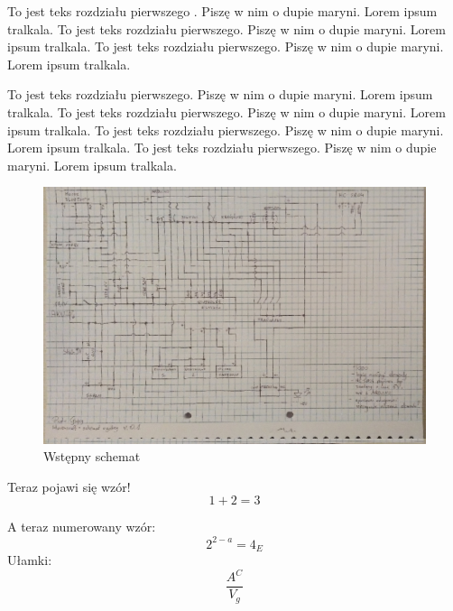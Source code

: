 \documentclass[test.tex]{subfiles}
\begin{document}
To jest teks rozdziału pierwszego \cite{Nowak} . Piszę w nim o dupie maryni.
Lorem ipsum tralkala. To jest teks rozdziału pierwszego. Piszę w nim o dupie maryni.
Lorem ipsum tralkala. To jest teks rozdziału pierwszego. Piszę w nim o dupie maryni.
Lorem ipsum tralkala. 



To jest teks rozdziału pierwszego. Piszę w nim o dupie maryni.
Lorem ipsum tralkala. To jest teks rozdziału pierwszego. Piszę w nim o dupie maryni.
Lorem ipsum tralkala. 
To jest teks rozdziału pierwszego. Piszę w nim o dupie maryni.
Lorem ipsum tralkala. To jest teks rozdziału pierwszego. Piszę w nim o dupie maryni.
Lorem ipsum tralkala.  

\newpage
\begin{figure}[h]
\centering
\includegraphics[width=1\textwidth]{./obrazy/R1/schemat_v01.jpg}
\caption{Wstępny schemat}
\label{image-myimage}
\end{figure}

Teraz pojawi się wzór!
$$1+2=3$$

A teraz numerowany wzór:
\begin{equation}
2^{2-a}=4_{E}
\end{equation}
Ułamki:$$\frac{A^C}{V_g}$$
\end{document}
